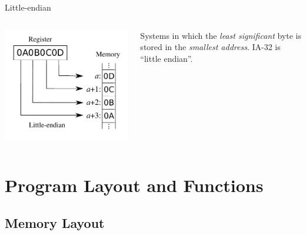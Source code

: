 \documentclass[]{beamer}
\begin{document}
\begin{frame}
\begin{block}{Little-endian}
\begin{columns}
\begin{column}{0.25\columnwidth}
      \includegraphics[width=\textwidth]{images/Little-Endian.pdf}
      \label{Little-Endian (right)}

    \end{column}
    \begin{column}{0.6\columnwidth}
      Systems in
      which the \emph{least significant} byte is stored in the
      \emph{smallest address}. \alert{IA-32 is ``little endian''}.

    \end{column}

  \end{columns}
  \end{block}
\end{frame}

\section{Program Layout and Functions}

\subsection{Memory Layout}
\end{document}
